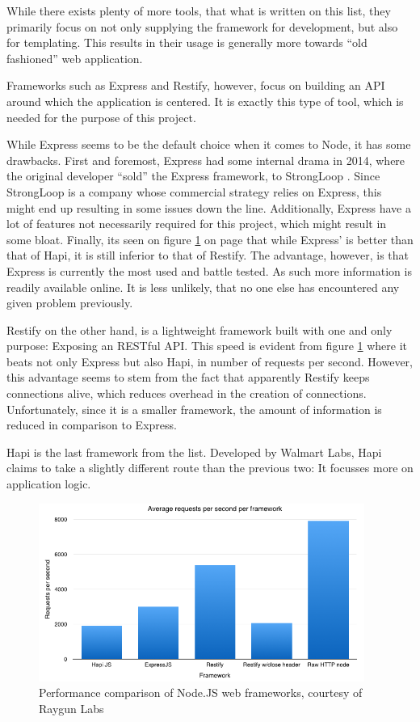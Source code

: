 			While there exists plenty of more tools, that what is written on this list, they primarily focus on not only supplying the framework for development, but also for templating. This results in their usage is generally more towards ``old fashioned'' web application.

			Frameworks such as Express and Restify, however, focus on building an API around which the application is centered. It is exactly this type of tool, which is needed for the purpose of this project.

			While Express seems to be the default choice when it comes to Node, it has some	drawbacks. First and foremost, Express had some internal drama in 2014, where the original developer ``sold'' the Express framework, to StrongLoop . Since StrongLoop is a company whose commercial strategy relies on Express, this might end up resulting in some issues down the line. Additionally, Express have a lot of features not necessarily required for this project, which might result in some bloat. Finally, its seen on figure \ref{fig:node_performance} on page \pageref{fig:node_performance} that while Express' is better than that of Hapi, it is still inferior to that of Restify. The advantage, however, is that Express is currently the most used and battle tested. As such more information is readily available online. It is less unlikely, that no one else has encountered any given problem previously.

			Restify on the other hand, is a lightweight framework built with one and only purpose: Exposing an RESTful API. This speed is evident from figure \ref{fig:node_performance} where it beats not only Express but also Hapi, in number of requests per second. However, this advantage seems to stem from the fact that apparently Restify keeps connections alive, which reduces overhead in the creation of connections. Unfortunately, since it is a smaller framework, the amount of information is reduced in comparison to Express.

			
			Hapi is the last framework from the list. Developed by Walmart Labs, Hapi claims to take a slightly different route than the previous two: It focusses more on application logic. 

			\begin{figure}[htbp]
				\centering
				\includegraphics[width=0.95\textwidth]{figures/design/node-framework-performance.png}
				\caption{Performance comparison of Node.JS web frameworks, courtesy of Raygun Labs \cite{node_framework}}
				\label{fig:node_performance}
			\end{figure}